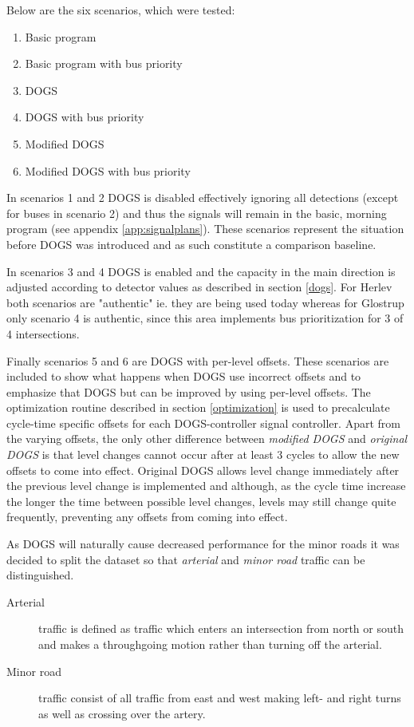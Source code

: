Below are the six scenarios, which were tested:

\begin{enumerate}
\item Basic program
\item Basic program with bus priority
\item DOGS
\item DOGS with bus priority
\item Modified DOGS
\item Modified DOGS with bus priority
\end{enumerate}

In scenarios 1 and 2 DOGS is disabled effectively ignoring all detections (except for buses in scenario 2) and thus the signals will remain in the basic, morning program (see appendix \ref{app:signalplans}). These scenarios represent the situation before DOGS was introduced and as such constitute a comparison baseline.

In scenarios 3 and 4 DOGS is enabled and the capacity in the main direction is adjusted according to detector values as described in section \ref{dogs}. For Herlev both scenarios are "authentic" ie. they are being used today whereas for Glostrup only scenario 4 is authentic, since this area implements bus prioritization for 3 of 4 intersections.

Finally scenarios 5 and 6 are DOGS with per-level offsets. These scenarios are included to show what happens when DOGS use incorrect offsets and to emphasize that DOGS but can be improved by using per-level offsets. 
The optimization routine described in section \ref{optimization} is used to precalculate cycle-time specific offsets for each DOGS-controller signal controller. 
Apart from the varying offsets, the only other difference between \textit{modified DOGS} and \textit{original DOGS} is that level changes cannot occur after at least 3 cycles to allow the new offsets to come into effect. Original DOGS allows level change immediately after the previous level change is implemented and although, as the cycle time increase the longer the time between possible level changes, levels may still change quite frequently, preventing any offsets from coming into effect.

As DOGS will naturally cause decreased performance for the minor roads it was decided to split the dataset so that \textit{arterial} and \textit{minor road} traffic can be distinguished. 

\begin{description}
\item[Arterial] traffic is defined as traffic which enters an intersection from north or south and makes a throughgoing motion rather than turning off the arterial. 
\item[Minor road] traffic consist of all traffic from east and west making left- and right turns as well as crossing over the artery.
\end{description}

